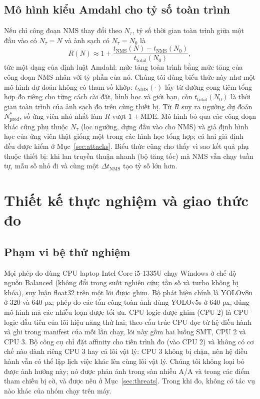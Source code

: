 \documentclass[12pt,a4paper]{article}
\newcommand{\Ntau}{N_{\tau}}
\begin{document}
\subsection{Mô hình kiểu Amdahl cho tỷ số toàn trình}
\label{sec:amdahl}
Nếu chỉ công đoạn NMS thay đổi theo $\Ntau$, tỷ số thời gian toàn trình giữa một đầu vào có $\Ntau = N$ và ảnh sạch có $\Ntau = N_0$ là
\begin{equation}
R(N) \approx 1 + \frac{t_{\mathrm{NMS}}(N) - t_{\mathrm{NMS}}(N_0)}{t_{\mathrm{total}}(N_0)} ,
\end{equation}
tức một dạng của định luật Amdahl: mức tăng toàn trình bằng mức tăng của công đoạn NMS nhân với tỷ phần của nó. Chúng tôi dùng biểu thức này như một mô hình dự đoán không có tham số khớp: $t_{\mathrm{NMS}}(\cdot)$ lấy từ đường cong tiêm tổng hợp đo riêng cho từng cách cài đặt, hình học và giới hạn, còn $t_{\mathrm{total}}(N_0)$ là thời gian toàn trình của ảnh sạch đo trên cùng thiết bị. Từ $R$ suy ra ngưỡng dự đoán $N^{*}_{\mathrm{pred}}$, số ứng viên nhỏ nhất làm $R$ vượt $1+\mathrm{MDE}$. Mô hình bỏ qua các công đoạn khác cũng phụ thuộc $\Ntau$ (lọc ngưỡng, dựng đầu vào cho NMS) và giả định hình học của ứng viên thật giống một trong các hình học tổng hợp; cả hai giả định đều được kiểm ở Mục~\ref{sec:attacks}. Biểu thức cũng cho thấy vì sao kết quả phụ thuộc thiết bị: khi lan truyền thuận nhanh (bộ tăng tốc) mà NMS vẫn chạy tuần tự, mẫu số nhỏ đi và cùng một $\Delta t_{\mathrm{NMS}}$ tạo tỷ số lớn hơn.

\section{Thiết kế thực nghiệm và giao thức đo}
\label{sec:protocol}
\subsection{Phạm vi bệ thử nghiệm}
Mọi phép đo dùng CPU laptop Intel Core i5-1335U chạy Windows ở chế độ nguồn Balanced (không đổi trong suốt nghiên cứu; tần số và turbo không bị khóa), suy luận float32 trên một lõi được ghim. Bộ phát hiện chính là YOLOv8n ở 320 và 640 px; phép đo các tấn công toàn ảnh dùng YOLOv5s ở 640 px, đúng mô hình mà các nhiễu loạn được tối ưu. CPU logic được ghim (CPU 2) là CPU logic đầu tiên của lõi hiệu năng thứ hai; theo cấu trúc CPU đọc từ hệ điều hành và ghi trong manifest của mỗi lần chạy, lõi này gồm hai luồng SMT, CPU 2 và CPU 3. Bộ công cụ chỉ đặt affinity cho tiến trình đo (vào CPU 2) và không có cơ chế nào dành riêng CPU 3 hay cả lõi vật lý: CPU 3 không bị chặn, nên hệ điều hành vẫn có thể lập lịch việc khác lên cùng lõi vật lý. Chúng tôi không loại bỏ được ảnh hưởng này; nó được phản ánh trong sàn nhiễu A/A và trong các điểm tham chiếu bị cờ, và được nêu ở Mục~\ref{sec:threats}. Trong khi đo, không có tác vụ nào khác của nhóm chạy trên máy.
\end{document}
